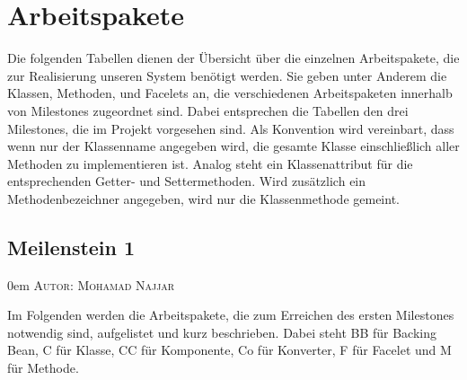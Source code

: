 \documentclass{article}
\makeatletter
\newcommand{\sectionauthor}[1]{
	{\parindent 0em \large \scshape Autor: #1 \par \nobreak \vspace*{1em}}
	\@afterheading
}
\makeatother
\begin{document}
\section{Arbeitspakete}

Die folgenden Tabellen dienen der Übersicht über die einzelnen Arbeitspakete, die zur Realisierung unseren System benötigt werden.
Sie geben unter Anderem die Klassen, Methoden, und Facelets an, die verschiedenen Arbeitspaketen innerhalb von Milestones zugeordnet sind. 
Dabei entsprechen die Tabellen den drei Milestones, die im Projekt vorgesehen sind.
Als Konvention wird vereinbart, dass wenn nur der Klassenname angegeben wird, die gesamte Klasse einschließlich aller Methoden zu implementieren ist. 
Analog steht ein Klassenattribut für die entsprechenden Getter- und Settermethoden.
Wird zusätzlich ein Methodenbezeichner angegeben, wird nur die Klassenmethode gemeint.


\subsection{Meilenstein 1}
\sectionauthor{Mohamad Najjar}
Im Folgenden werden die Arbeitspakete, die zum Erreichen des ersten Milestones notwendig sind, aufgelistet und kurz beschrieben. Dabei steht BB für Backing Bean, C für Klasse, CC für Komponente, Co für Konverter, F für Facelet und M für Methode.\\
\end{document}

